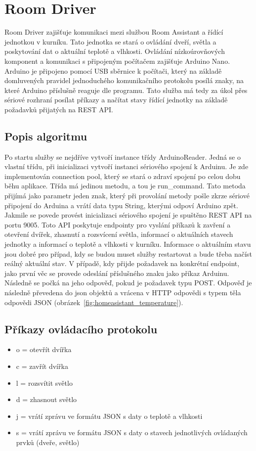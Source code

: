 \section{Room Driver}\label{sec:room-driver}
Room Driver zajišťuje komunikaci mezi službou Room Assistant a řídící jednotkou v kurníku.
Tato jednotka se stará o ovládání dveří, světla a poskytování dat o aktuální teplotě a vlhkosti.
Ovládání nízkoúrovňových komponent a komunikaci s připojeným počítačem zajišťuje Arduino Nano.
Arduino je připojeno pomocí USB sběrnice k počítači, který na základě domluvených pravidel jednoduchého komunikačního protokolu posílá znaky, na které Arduino příslušně reaguje dle programu.
Tato služba má tedy za úkol přes sériové rozhraní posílat příkazy a načítat stavy řídící jednotky na základě požadavků přijatých na REST API.

\subsection*{Popis algoritmu}
Po startu služby se nejdříve vytvoří instance třídy ArduinoReader.
Jedná se o vlastní třídu, při inicializaci vytvoří instanci sériového spojení k Arduinu.
Je zde implementován connection pool, který se stará o zdraví spojení po celou dobu běhu aplikace.
Třída má jedinou metodu, a tou je run\_command.
Tato metoda přijímá jako parametr jeden znak, který při provolání metody pošle zkrze sériové připojení do Arduina a vrátí data typu String, kterými odpoví Arduino zpět.
Jakmile se povede provést inicializaci sériového spojení je spuštěno REST API na portu 9005.
Toto API poskytuje endpointy pro vyslání příkazů k zavření a otevření dvířek, zhasnutí a rozsvícení světla, informací o aktuálních stavech jednotky a informací o teplotě a vlhkosti v kurníku.
Informace o aktuálním stavu jsou dobré pro případ, kdy se budou muset služby restartovat a bude třeba načíst reálný aktuální stav.
V případě, kdy přijde požadavek na konkrétní endpoint, jako první věc se provede odeslání příslušného znaku jako příkaz Arduinu.
Následně se počká na jeho odpověď, pokud je požadavek typu POST.
Odpověď je následně převedena do \gls{json} objektů a vrácena v HTTP odpovědi s typem těla odpovědi JSON (obrázek~\ref{fig:homeasistant_temperature}).

\subsection*{Příkazy ovládacího protokolu}
\begin{itemize}
    \item o = otevřít dvířka
    \item c = zavřít dvířka
    \item l = rozsvítit světlo
    \item d = zhasnout světlo
    \item j = vrátí zprávu ve formátu JSON s daty o teplotě a vlhkosti
    \item s = vrátí zprávu ve formátu JSON s daty o stavech jednotlivých ovládaných prvků (dveře, světlo)
\end{itemize}




